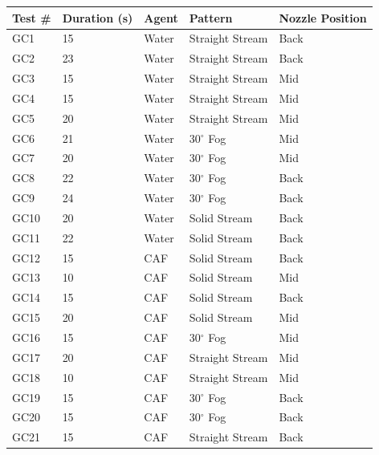 \documentclass[12pt,oneside]{book}
\begin{document}
\begin{table}[!ht]
\footnotesize
\centering
{}\label{tab:spray_density_tests}
\begin{tabular}{lllll}
\toprule[1.5pt]
Test \#    &  Duration (s)  & Agent  &  Pattern            & Nozzle Position  \\
\midrule
GC1        &  15            & Water  &  Straight Stream    & Back             \\
GC2        &  23            & Water  &  Straight Stream    & Back             \\
GC3        &  15            & Water  &  Straight Stream    & Mid              \\
GC4        &  15            & Water  &  Straight Stream    & Mid              \\
GC5        &  20            & Water  &  Straight Stream    & Mid              \\
GC6        &  21            & Water  &  30$^{\circ}$ Fog   & Mid              \\
GC7        &  20            & Water  &  30$^{\circ}$ Fog   & Mid              \\
GC8        &  22            & Water  &  30$^{\circ}$ Fog   & Back             \\
GC9        &  24            & Water  &  30$^{\circ}$ Fog   & Back             \\
GC10       &  20            & Water  &  Solid Stream       & Back             \\
GC11       &  22            & Water  &  Solid Stream       & Back             \\
GC12       &  15            & CAF    &  Solid Stream       & Back             \\
GC13       &  10            & CAF    &  Solid Stream       & Mid              \\
GC14       &  15            & CAF    &  Solid Stream       & Back             \\
GC15       &  20            & CAF    &  Solid Stream       & Mid              \\
GC16       &  15            & CAF    &  30$^{\circ}$ Fog   & Mid              \\
GC17       &  20            & CAF    &  Straight Stream    & Mid             \\
GC18       &  10            & CAF    &  Straight Stream    & Mid             \\
GC19       &  15            & CAF    &  30$^{\circ}$ Fog   & Back             \\
GC20       &  15            & CAF    &  30$^{\circ}$ Fog   & Back             \\
GC21       &  15            & CAF    &  Straight Stream    & Back             \\

\bottomrule[1.25pt]
\end{tabular}\par
\end{table}
\end{document}
